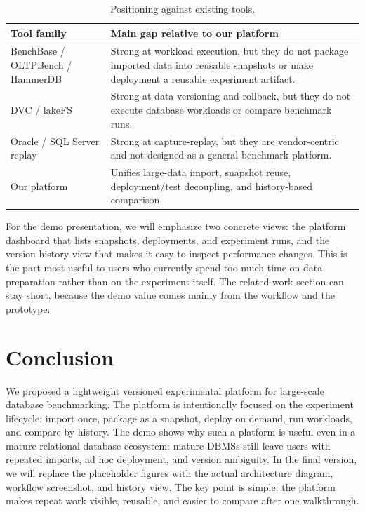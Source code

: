 \documentclass[runningheads]{llncs}
\begin{document}
\begin{table}[t]
\centering
\small
\caption{Positioning against existing tools.}
\begin{tabular}{p{2.6cm}p{4.4cm}}
\hline
Tool family & Main gap relative to our platform \\
\hline
BenchBase / OLTPBench / HammerDB & Strong at workload execution, but they do not package imported data into reusable snapshots or make deployment a reusable experiment artifact. \\
DVC / lakeFS & Strong at data versioning and rollback, but they do not execute database workloads or compare benchmark runs. \\
Oracle / SQL Server replay & Strong at capture-replay, but they are vendor-centric and not designed as a general benchmark platform. \\
Our platform & Unifies large-data import, snapshot reuse, deployment/test decoupling, and history-based comparison. \\
\hline
\end{tabular}
\label{tab:positioning}
\end{table}

For the demo presentation, we will emphasize two concrete views: the platform dashboard that lists snapshots, deployments, and experiment runs, and the version history view that makes it easy to inspect performance changes. This is the part most useful to users who currently spend too much time on data preparation rather than on the experiment itself. The related-work section can stay short, because the demo value comes mainly from the workflow and the prototype.

\section{Conclusion}
We proposed a lightweight versioned experimental platform for large-scale database benchmarking. The platform is intentionally focused on the experiment lifecycle: import once, package as a snapshot, deploy on demand, run workloads, and compare by history. The demo shows why such a platform is useful even in a mature relational database ecosystem: mature DBMSs still leave users with repeated imports, ad hoc deployment, and version ambiguity. In the final version, we will replace the placeholder figures with the actual architecture diagram, workflow screenshot, and history view. The key point is simple: the platform makes repeat work visible, reusable, and easier to compare after one walkthrough.
\end{document}
